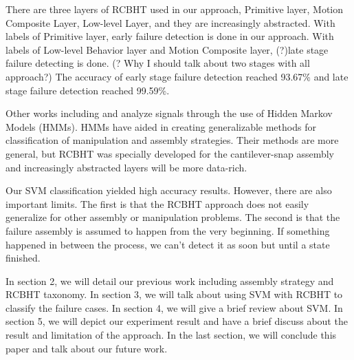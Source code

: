 \indent There are three layers of RCBHT used in our approach, Primitive layer, Motion Composite Layer, Low-level Layer, and they are increasingly abstracted. With labels of Primitive layer, early failure detection is done in our approach. With labels of Low-level Behavior layer and Motion Composite layer, (?)late stage failure detecting is done. (? Why I should talk about two stages with all approach?) The accuracy of early stage failure detection reached 93.67\% and late stage failure detection reached 99.59\%.

\indent Other works including \cite{rodriguez2011abort} and \cite{di2013bayesian} analyze signals through the use of Hidden Markov Models (HMMs). HMMs have aided in creating generalizable methods for classification of manipulation and assembly strategies. Their methods are more general, but RCBHT was specially developed for the cantilever-snap assembly and increasingly abstracted layers will be more data-rich.

\indent Our SVM classification yielded high accuracy results. However, there are also important limits. The first is that the RCBHT approach does not easily generalize for other assembly or manipulation problems. The second is that the failure assembly is assumed to happen from the very beginning. If something happened in between the process, we can't detect it as soon but until a state finished.

\indent In section 2, we will detail our previous work including assembly strategy and RCBHT taxonomy. In section 3, we will talk about using SVM with RCBHT to classify the failure cases. In section 4, we will give a brief review about SVM. In section 5, we will depict our experiment result and have a brief discuss about the result and limitation of the approach. In the last section, we will conclude this paper and talk about our future work.
